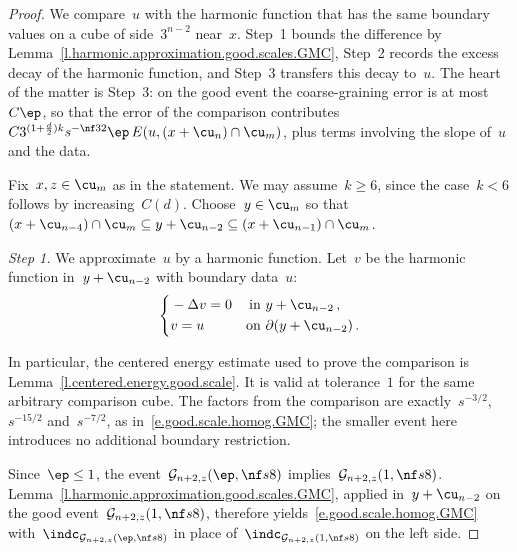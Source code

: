 \documentclass[11pt]{amsart}
\begin{document}
\begin{proof}
We compare~$u$ with the harmonic function that has the same boundary values on a cube of side~$3^{n-2}$ near~$x$. Step~1 bounds the difference by Lemma~\ref{l.harmonic.approximation.good.scales.GMC}, Step~2 records the excess decay of the harmonic function, and Step~3 transfers this decay to~$u$. The heart of the matter is Step~3: on the good event the coarse-graining error is at most~$C\ep$, so that the error of the comparison contributes~$C3^{(1+\frac{d}{2})k}s^{-\nf32}\ep\,E(u,(x+\cu_{n})\cap\cu_m)$, plus terms involving the slope of~$u$ and the data.

\smallskip

Fix~$x,z\in\cu_m$ as in the statement. We may assume~$k\geq6$, since the case~$k<6$ follows by increasing~$C(d)$. Choose~$y\in\cu_m$ so that~$(x+\cu_{n-4})\cap\cu_m\subseteq y+\cu_{n-2}\subseteq (x+\cu_{n-1})\cap\cu_m$.

\smallskip

\emph{Step 1.} We approximate~$u$ by a harmonic function. Let~$v$ be the harmonic function in~$y+\cu_{n-2}$ with boundary data~$u$:
\begin{equation*}
	\left\{
	\begin{aligned}
		& -\Delta v = 0  & \text{in} & \ y+\cu_{n-2}\,,
		\\
		&
		v = u & \text{on} & \ \partial (y+\cu_{n-2})\,.
	\end{aligned}
	\right.
\end{equation*}

\smallskip

In particular, the centered energy estimate used to prove the comparison is Lemma~\ref{l.centered.energy.good.scale}. It is valid at tolerance~$1$ for the same arbitrary comparison cube. The factors from the comparison are exactly~$s^{-3/2}$,~$s^{-15/2}$ and~$s^{-7/2}$, as in~\eqref{e.good.scale.homog.GMC}; the smaller event here introduces no additional boundary restriction.

\smallskip

Since~$\ep \leq 1$, the event~$\mathcal{G}_{n+2,z}(\ep,\nf s8)$ implies~$\mathcal{G}_{n+2,z}(1,\nf s8)$. Lemma~\ref{l.harmonic.approximation.good.scales.GMC}, applied in~$y + \cu_{n-2}$ on the good event~$\mathcal{G}_{n+2,z}(1,\nf s8)$, therefore yields~\eqref{e.good.scale.homog.GMC} with~$\indc_{\mathcal{G}_{n+2,z}(\ep,\nf s8)}$ in place of~$\indc_{\mathcal{G}_{n+2,z}(1,\nf s8)}$ on the left side.

\smallskip


\end{proof}
\end{document}

